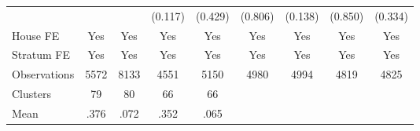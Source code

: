 {\begin{tabular}{l*{8}{c}}
                &                  &                  &  (0.117)         &  (0.429)         &  (0.806)         &  (0.138)         &  (0.850)         &  (0.334)         \\
House FE        &      Yes         &      Yes         &      Yes         &      Yes         &      Yes         &      Yes         &      Yes         &      Yes         \\
Stratum FE      &      Yes         &      Yes         &      Yes         &      Yes         &      Yes         &      Yes         &      Yes         &      Yes         \\
\midrule
Observations    &     5572         &     8133         &     4551         &     5150         &     4980         &     4994         &     4819         &     4825         \\
Clusters        &       79         &       80         &       66         &       66         &                  &                  &                  &                  \\
Mean            &     .376         &     .072         &     .352         &     .065         &                  &                  &                  &                  \\
\bottomrule
\end{tabular}
}
